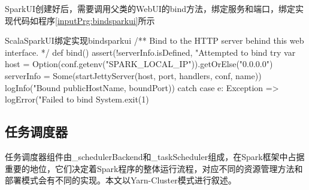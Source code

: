 SparkUI创建好后，需要调用父类的WebUI的bind方法，绑定服务和端口，绑定实现代码如程序\ref{inputPrg:bindsparkui}所示
\begin{codeInput}{Scala}{SparkUI绑定实现}{bindsparkui}
  /** Bind to the HTTP server behind this web interface. */
  def bind() {
    assert(!serverInfo.isDefined, "Attempted to bind %
    try {
      var host = Option(conf.getenv("SPARK_LOCAL_IP")).getOrElse("0.0.0.0")
      serverInfo = Some(startJettyServer(host, port, handlers, conf, name))
      logInfo("Bound %
        publicHostName, boundPort))
      } catch {
        case e: Exception =>
          logError("Failed to bind %
          System.exit(1)
      }
  }
\end{codeInput}
\subsection{任务调度器}
任务调度器组件由\_schedulerBackend和\_taskScheduler组成，在Spark框架中占据重要的地位，它们决定着Spark程序的整体运行流程，对应不同的资源管理方法和部署模式会有不同的实现。本文以Yarn-Cluster模式进行叙述。

